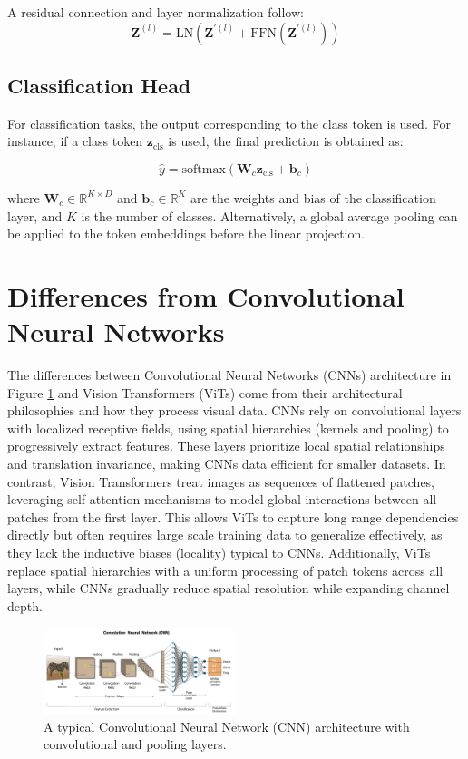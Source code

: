 A residual connection and layer normalization follow:
\begin{equation}
  \mathbf{Z}^{(l)} = \text{LN}\left(\mathbf{Z}^{\prime(l)} + \text{FFN}(\mathbf{Z}^{\prime(l)})\right)
\end{equation}

\subsection{Classification Head}

For classification tasks, the output corresponding to the class token is used. For instance, if a class token \(\mathbf{z}_{\text{cls}}\) is used, the final prediction is obtained as:

\begin{equation}
  \hat{y} = \text{softmax}\left(\mathbf{W}_c \mathbf{z}_{\text{cls}} + \mathbf{b}_c\right)
\end{equation}

where \(\mathbf{W}_c \in \mathbb{R}^{K \times D}\) and \(\mathbf{b}_c \in \mathbb{R}^{K}\) are the weights and bias of the classification layer, and \(K\) is the number of classes. Alternatively, a global average pooling can be applied to the token embeddings before the linear projection.


\section{Differences from Convolutional Neural Networks}
The differences between Convolutional Neural Networks (CNNs) architecture in Figure \ref{fig:cnn-arch} and Vision Transformers (ViTs) come from their architectural philosophies and how they process visual data. CNNs rely on convolutional layers with localized receptive fields, using spatial hierarchies (kernels and pooling) to progressively extract features. These layers prioritize local spatial relationships and translation invariance, making CNNs data efficient for smaller datasets. In contrast, Vision Transformers treat images as sequences of flattened patches, leveraging self attention mechanisms to model global interactions between all patches from the first layer. This allows ViTs to capture long range dependencies directly but often requires large scale training data to generalize effectively, as they lack the inductive biases (locality) typical to CNNs. Additionally, ViTs replace spatial hierarchies with a uniform processing of patch tokens across all layers, while CNNs gradually reduce spatial resolution while expanding channel depth.

\begin{figure}[H]
    \centering
    \includegraphics[width=0.5\textwidth]{images/cnn_architecture.png}
    \caption{A typical Convolutional Neural Network (CNN) architecture with convolutional and pooling layers.}
    \label{fig:cnn-arch}
\end{figure}